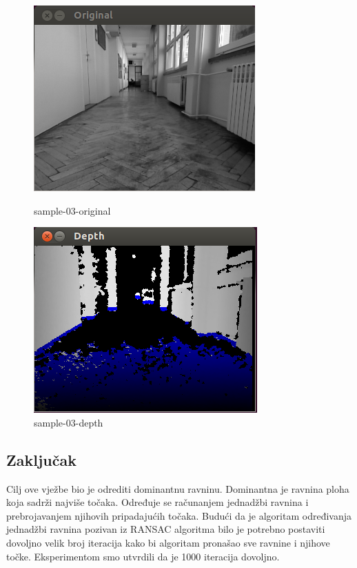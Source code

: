 \begin{figure}
\centering
\begin{minipage}{.5\textwidth}
  \centering
  \includegraphics[width=.9\linewidth]{images/lab6-sample-03-or.png}
  \caption{sample-03-original}
  \label{fig:sample-03-original}
\end{minipage}%
\begin{minipage}{.5\textwidth}
  \centering
  \includegraphics[width=.9\linewidth]{images/lab6-sample-03-dp.png}
  \caption{sample-03-depth}
  \label{fig:sample-03-depth}
\end{minipage}
\end{figure}

\subsection{Zaključak}
Cilj ove vježbe bio je odrediti dominantnu ravninu. Dominantna je
ravnina ploha koja sadrži najviše točaka. Određuje se računanjem
jednadžbi ravnina i prebrojavanjem njihovih pripadajućih točaka. 
Budući da je
algoritam određivanja jednadžbi ravnina pozivan iz RANSAC algoritma
bilo je potrebno postaviti dovoljno velik broj iteracija kako bi
algoritam pronašao sve ravnine i njihove točke. Eksperimentom smo
utvrdili da je 1000 iteracija dovoljno. 

